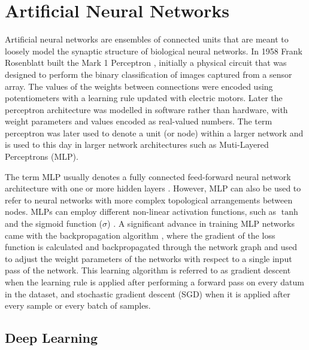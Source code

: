 \section{Artificial Neural Networks}

Artificial neural networks are ensembles of connected units that are meant to loosely model the synaptic structure of biological neural networks. 
In 1958 Frank Rosenblatt built the Mark 1 Perceptron \citep{rosenblatt1958perceptron}, initially a physical circuit that was designed to perform the binary classification of images captured from a sensor array. 
The values of the weights between connections were encoded using potentiometers with a learning rule updated with electric motors. 
Later the perceptron architecture was modelled in software rather than hardware, with weight parameters and values encoded as real-valued numbers. 
The term perceptron was later used to denote a unit (or node) within a larger network and is used to this day in larger network architectures such as Muti-Layered Perceptrons (MLP).

The term MLP usually denotes a fully connected feed-forward neural network architecture with one or more hidden layers \citep{rosenblatt1958perceptron}. 
However, MLP can also be used to refer to neural networks with more complex topological arrangements between nodes. 
MLPs can employ different non-linear activation functions, such as $\tanh$ \citep{kalman1992tanh} and the sigmoid function ($\sigma$) \citep{han1995influence}.
A significant advance in training MLP networks came with the backpropagation algorithm \citep{werbos1974beyond}, where the gradient of the loss function is calculated and backpropagated through the network graph and used to adjust the weight parameters of the networks with respect to a single input pass of the network. 
This learning algorithm is referred to as gradient descent when the learning rule is applied after performing a forward pass on every datum in the dataset, and stochastic gradient descent (SGD) when it is applied after every sample or every batch of samples. 

\subsection{Deep Learning}

